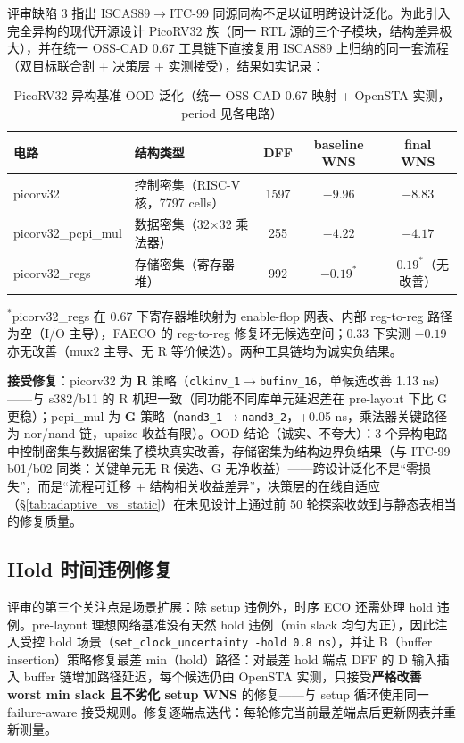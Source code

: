 \documentclass[journal]{IEEEtran}
\begin{document}
评审缺陷 3 指出 ISCAS89$\rightarrow$ITC-99 同源同构不足以证明跨设计泛化。为此引入完全异构的现代开源设计 PicoRV32 族（同一 RTL 源的三个子模块，结构差异极大），并在统一 OSS-CAD 0.67 工具链下直接复用 ISCAS89 上归纳的同一套流程（双目标联合割 + 决策层 + 实测接受），结果如实记录：

\begin{table}[!t]
\centering
\caption{PicoRV32 异构基准 OOD 泛化（统一 OSS-CAD 0.67 映射 + OpenSTA 实测，period 见各电路）}
\label{tab:ood}
\scriptsize
\setlength{\tabcolsep}{3pt}
\begin{tabular}{llccc}
\toprule
\textbf{电路} & \textbf{结构类型} & \textbf{DFF} & \textbf{baseline WNS} & \textbf{final WNS} \\
\midrule
picorv32 & 控制密集（RISC-V 核，7797 cells） & 1597 & $-9.96$ & $\mathbf{-8.83}$ \\
picorv32\_pcpi\_mul & 数据密集（32$\times$32 乘法器） & 255 & $-4.22$ & $-4.17$ \\
picorv32\_regs & 存储密集（寄存器堆） & 992 & $-0.19^{\ast}$ & $-0.19^{\ast}$（无改善） \\
\bottomrule
\end{tabular}

\scriptsize
$^{\ast}$picorv32\_regs 在 0.67 下寄存器堆映射为 enable-flop 网表、内部 reg-to-reg 路径为空（I/O 主导），FAECO 的 reg-to-reg 修复环无候选空间；0.33 下实测 $-0.19$ 亦无改善（mux2 主导、无 R 等价候选）。两种工具链均为诚实负结果。
\end{table}

\textbf{接受修复}：picorv32 为 \textbf{R} 策略（\texttt{clkinv\_1}$\rightarrow$\texttt{bufinv\_16}，单候选改善 1.13 ns）——与 s382/b11 的 R 机理一致（同功能不同库单元延迟差在 pre-layout 下比 G 更稳）；pcpi\_mul 为 \textbf{G} 策略（\texttt{nand3\_1}$\rightarrow$\texttt{nand3\_2}，+0.05 ns，乘法器关键路径为 nor/nand 链，upsize 收益有限）。OOD 结论（诚实、不夸大）：3 个异构电路中控制密集与数据密集子模块真实改善，存储密集为结构边界负结果（与 ITC-99 b01/b02 同类：关键单元无 R 候选、G 无净收益）——跨设计泛化不是“零损失”，而是“流程可迁移 + 结构相关收益差异”，决策层的在线自适应（\S\ref{tab:adaptive_vs_static}）在未见设计上通过前 50 轮探索收敛到与静态表相当的修复质量。


\subsection{Hold 时间违例修复}\label{sec:hold}

评审的第三个关注点是场景扩展：除 setup 违例外，时序 ECO 还需处理 hold 违例。pre-layout 理想网络基准没有天然 hold 违例（min slack 均匀为正），因此注入受控 hold 场景（\texttt{set\_clock\_uncertainty -hold 0.8\,ns}），并让 B（buffer insertion）策略修复最差 min（hold）路径：对最差 hold 端点 DFF 的 D 输入插入 buffer 链增加路径延迟，每个候选仍由 OpenSTA 实测，只接受\textbf{严格改善 worst min slack 且不劣化 setup WNS} 的修复——与 setup 循环使用同一 failure-aware 接受规则。修复逐端点迭代：每轮修完当前最差端点后更新网表并重新测量。
\end{document}
